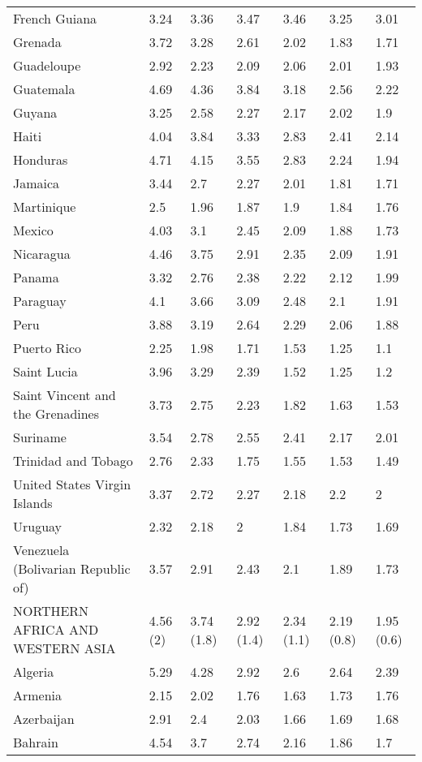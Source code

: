 \begin{longtable}[t]{lllllll}
French Guiana & 3.24 & 3.36 & 3.47 & 3.46 & 3.25 & 3.01\\
Grenada & 3.72 & 3.28 & 2.61 & 2.02 & 1.83 & 1.71\\
Guadeloupe & 2.92 & 2.23 & 2.09 & 2.06 & 2.01 & 1.93\\
Guatemala & 4.69 & 4.36 & 3.84 & 3.18 & 2.56 & 2.22\\
Guyana & 3.25 & 2.58 & 2.27 & 2.17 & 2.02 & 1.9\\
Haiti & 4.04 & 3.84 & 3.33 & 2.83 & 2.41 & 2.14\\
Honduras & 4.71 & 4.15 & 3.55 & 2.83 & 2.24 & 1.94\\
Jamaica & 3.44 & 2.7 & 2.27 & 2.01 & 1.81 & 1.71\\
Martinique & 2.5 & 1.96 & 1.87 & 1.9 & 1.84 & 1.76\\
Mexico & 4.03 & 3.1 & 2.45 & 2.09 & 1.88 & 1.73\\
Nicaragua & 4.46 & 3.75 & 2.91 & 2.35 & 2.09 & 1.91\\
Panama & 3.32 & 2.76 & 2.38 & 2.22 & 2.12 & 1.99\\
Paraguay & 4.1 & 3.66 & 3.09 & 2.48 & 2.1 & 1.91\\
Peru & 3.88 & 3.19 & 2.64 & 2.29 & 2.06 & 1.88\\
Puerto Rico & 2.25 & 1.98 & 1.71 & 1.53 & 1.25 & 1.1\\
Saint Lucia & 3.96 & 3.29 & 2.39 & 1.52 & 1.25 & 1.2\\
Saint Vincent and the Grenadines & 3.73 & 2.75 & 2.23 & 1.82 & 1.63 & 1.53\\
Suriname & 3.54 & 2.78 & 2.55 & 2.41 & 2.17 & 2.01\\
Trinidad and Tobago & 2.76 & 2.33 & 1.75 & 1.55 & 1.53 & 1.49\\
United States Virgin Islands & 3.37 & 2.72 & 2.27 & 2.18 & 2.2 & 2\\
Uruguay & 2.32 & 2.18 & 2 & 1.84 & 1.73 & 1.69\\
Venezuela (Bolivarian Republic of) & 3.57 & 2.91 & 2.43 & 2.1 & 1.89 & 1.73\\
NORTHERN AFRICA AND WESTERN ASIA & 4.56 (2) & 3.74 (1.8) & 2.92 (1.4) & 2.34 (1.1) & 2.19 (0.8) & 1.95 (0.6)\\
Algeria & 5.29 & 4.28 & 2.92 & 2.6 & 2.64 & 2.39\\
Armenia & 2.15 & 2.02 & 1.76 & 1.63 & 1.73 & 1.76\\
Azerbaijan & 2.91 & 2.4 & 2.03 & 1.66 & 1.69 & 1.68\\
Bahrain & 4.54 & 3.7 & 2.74 & 2.16 & 1.86 & 1.7\\

\end{longtable}
